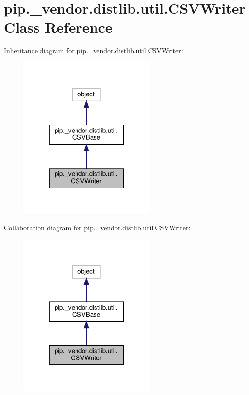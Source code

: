 \hypertarget{classpip_1_1__vendor_1_1distlib_1_1util_1_1CSVWriter}{}\section{pip.\+\_\+vendor.\+distlib.\+util.\+C\+S\+V\+Writer Class Reference}
\label{classpip_1_1__vendor_1_1distlib_1_1util_1_1CSVWriter}


Inheritance diagram for pip.\+\_\+vendor.\+distlib.\+util.\+C\+S\+V\+Writer\+:
\nopagebreak
\begin{figure}[H]
\begin{center}
\leavevmode
\includegraphics[width=194pt]{classpip_1_1__vendor_1_1distlib_1_1util_1_1CSVWriter__inherit__graph}
\end{center}
\end{figure}


Collaboration diagram for pip.\+\_\+vendor.\+distlib.\+util.\+C\+S\+V\+Writer\+:
\nopagebreak
\begin{figure}[H]
\begin{center}
\leavevmode
\includegraphics[width=194pt]{classpip_1_1__vendor_1_1distlib_1_1util_1_1CSVWriter__coll__graph}
\end{center}
\end{figure}
